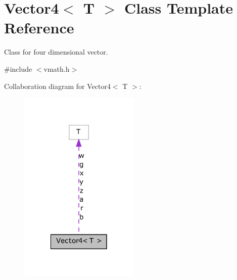 \hypertarget{class_vector4}{
\section{Vector4$<$ T $>$ Class Template Reference}
\label{class_vector4}
}


Class for four dimensional vector.  




{\ttfamily \#include $<$vmath.h$>$}



Collaboration diagram for Vector4$<$ T $>$:
\nopagebreak
\begin{figure}[H]
\begin{center}
\leavevmode
\includegraphics[width=162pt]{class_vector4__coll__graph}
\end{center}
\end{figure}
